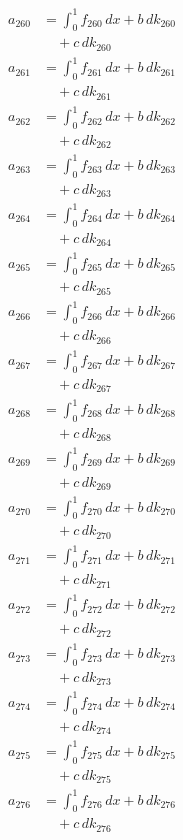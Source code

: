 \documentclass{article}
\begin{document}
\begin{align}
a_{260} &= \int_0^1 f_{260}\,dx + b\,dk_{260} \\
&\quad + c\,dk_{260} \\
a_{261} &= \int_0^1 f_{261}\,dx + b\,dk_{261} \\
&\quad + c\,dk_{261} \\
a_{262} &= \int_0^1 f_{262}\,dx + b\,dk_{262} \\
&\quad + c\,dk_{262} \\
a_{263} &= \int_0^1 f_{263}\,dx + b\,dk_{263} \\
&\quad + c\,dk_{263} \\
a_{264} &= \int_0^1 f_{264}\,dx + b\,dk_{264} \\
&\quad + c\,dk_{264} \\
a_{265} &= \int_0^1 f_{265}\,dx + b\,dk_{265} \\
&\quad + c\,dk_{265} \\
a_{266} &= \int_0^1 f_{266}\,dx + b\,dk_{266} \\
&\quad + c\,dk_{266} \\
a_{267} &= \int_0^1 f_{267}\,dx + b\,dk_{267} \\
&\quad + c\,dk_{267} \\
a_{268} &= \int_0^1 f_{268}\,dx + b\,dk_{268} \\
&\quad + c\,dk_{268} \\
a_{269} &= \int_0^1 f_{269}\,dx + b\,dk_{269} \\
&\quad + c\,dk_{269} \\
a_{270} &= \int_0^1 f_{270}\,dx + b\,dk_{270} \\
&\quad + c\,dk_{270} \\
a_{271} &= \int_0^1 f_{271}\,dx + b\,dk_{271} \\
&\quad + c\,dk_{271} \\
a_{272} &= \int_0^1 f_{272}\,dx + b\,dk_{272} \\
&\quad + c\,dk_{272} \\
a_{273} &= \int_0^1 f_{273}\,dx + b\,dk_{273} \\
&\quad + c\,dk_{273} \\
a_{274} &= \int_0^1 f_{274}\,dx + b\,dk_{274} \\
&\quad + c\,dk_{274} \\
a_{275} &= \int_0^1 f_{275}\,dx + b\,dk_{275} \\
&\quad + c\,dk_{275} \\
a_{276} &= \int_0^1 f_{276}\,dx + b\,dk_{276} \\
&\quad + c\,dk_{276} \\

\end{align}
\end{document}

